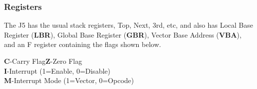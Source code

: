 \subsubsection{Registers}
The J5 has the usual stack registers, Top, Next, 3rd, etc, and also has Local
Base Register (\textbf{LBR}), Global Base Register (\textbf{GBR}), Vector Base
Address (\textbf{VBA}), and an F register containing the flags shown below.

\vspace{10mm}

\noindent\begin{minipage}[b]{0.5\linewidth}
\end{minipage}%
\noindent\begin{minipage}[b]{0.5\linewidth}
  \textbf{C}-Carry Flag\@ \textbf{Z}-Zero Flag\\
  \textbf{I}-Interrupt (1=Enable, 0=Disable)\\
  \textbf{M}-Interrupt Mode (1=Vector, 0=Opcode)
\end{minipage}

